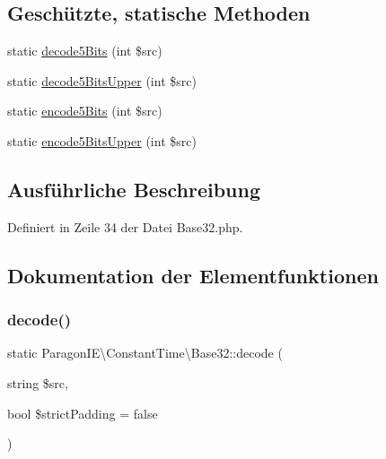 \subsection*{Geschützte, statische Methoden}
\begin{DoxyCompactItemize}
\item 
static \mbox{\hyperlink{class_paragon_i_e_1_1_constant_time_1_1_base32_a28eda6ea4db8f9e62ed89afcb6658a59}{decode5\+Bits}} (int \$src)
\item 
static \mbox{\hyperlink{class_paragon_i_e_1_1_constant_time_1_1_base32_a136d63488f57c44b94d573dc7f047fd9}{decode5\+Bits\+Upper}} (int \$src)
\item 
static \mbox{\hyperlink{class_paragon_i_e_1_1_constant_time_1_1_base32_a663f1dc13e3fb19c03b7335894931978}{encode5\+Bits}} (int \$src)
\item 
static \mbox{\hyperlink{class_paragon_i_e_1_1_constant_time_1_1_base32_aa456c4efdc8c51e5f55b58baca3f2f6d}{encode5\+Bits\+Upper}} (int \$src)
\end{DoxyCompactItemize}


\subsection{Ausführliche Beschreibung}


Definiert in Zeile 34 der Datei Base32.\+php.



\subsection{Dokumentation der Elementfunktionen}
\mbox{\label{class_paragon_i_e_1_1_constant_time_1_1_base32_af563051c30335628aff64b65b035ae3f}} 
\subsubsection{\texorpdfstring{decode()}{decode()}}
{\footnotesize\ttfamily static Paragon\+I\+E\textbackslash{}\+Constant\+Time\textbackslash{}\+Base32\+::decode (\begin{DoxyParamCaption}\item[{string}]{\$src,  }\item[{bool}]{\$strict\+Padding = {\ttfamily false} }\end{DoxyParamCaption})\hspace{0.3cm}{\ttfamily [static]}}

